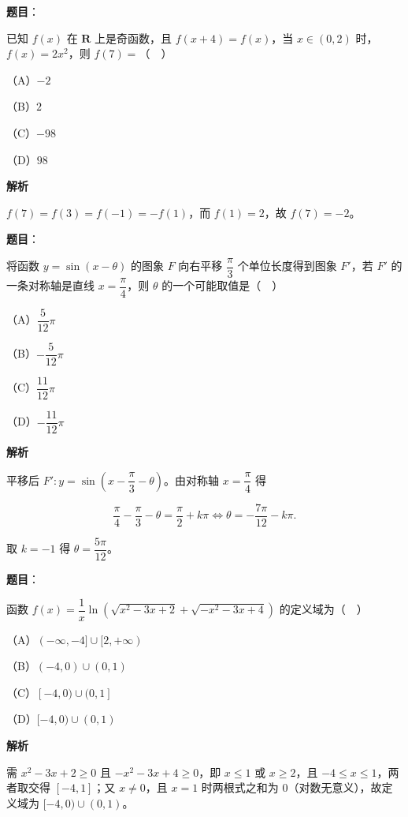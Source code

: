 \begin{answer}

\textbf{题目}：

已知 $f(x)$ 在 $\mathbf R$ 上是奇函数，且 $f(x+4)=f(x)$，当 $x\in(0,2)$ 时，$f(x)=2x^2$，则 $f(7)=$（　）

（A）$-2$

（B）$2$

（C）$-98$

（D）$98$

\textbf{解析}

$f(7)=f(3)=f(-1)=-f(1)$，而 $f(1)=2$，故 $f(7)=-2$。


\end{answer}
\begin{answer}

\textbf{题目}：

将函数 $y=\sin(x-\theta)$ 的图象 $F$ 向右平移 $\dfrac{\pi}3$ 个单位长度得到图象 $F'$，若 $F'$ 的一条对称轴是直线 $x=\dfrac{\pi}4$，则 $\theta$ 的一个可能取值是（　）

（A）$\dfrac5{12}\pi$

（B）$-\dfrac5{12}\pi$

（C）$\dfrac{11}{12}\pi$

（D）$-\dfrac{11}{12}\pi$

\textbf{解析}

平移后 $F':y=\sin\left(x-\dfrac{\pi}3-\theta\right)$。由对称轴 $x=\dfrac{\pi}4$ 得

\nopagebreak[4]
\[\frac{\pi}4-\frac{\pi}3-\theta=\frac{\pi}2+k\pi\iff\theta=-\frac{7\pi}{12}-k\pi.\]

取 $k=-1$ 得 $\theta=\dfrac{5\pi}{12}$。


\end{answer}
\begin{answer}

\textbf{题目}：

函数 $f(x)=\dfrac1x\ln\left(\sqrt{x^2-3x+2}+\sqrt{-x^2-3x+4}\right)$ 的定义域为（　）

（A）$(-\infty,-4]\cup[2,+\infty)$

（B）$(-4,0)\cup(0,1)$

（C）$[-4,0)\cup(0,1]$

（D）$[-4,0)\cup(0,1)$

\textbf{解析}

需 $x^2-3x+2\geqslant0$ 且 $-x^2-3x+4\geqslant0$，即 $x\leqslant1$ 或 $x\geqslant2$，且 $-4\leqslant x\leqslant1$，两者取交得 $[-4,1]$；又 $x\neq0$，且 $x=1$ 时两根式之和为 $0$（对数无意义），故定义域为 $[-4,0)\cup(0,1)$。


\end{answer}
